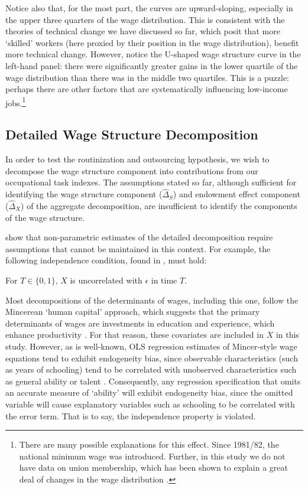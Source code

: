Notice also that, for the most part, the curves are upward-sloping, especially in the upper three quarters of the wage distribution. This is consistent with the theories of technical change we have discussed so far, which posit that more `skilled' workers (here proxied by their position in the wage distribution), benefit more technical change. However, notice the U-shaped wage structure curve in the left-hand panel: there were significantly greater gains in the lower quartile of the wage distribution than there was in the middle two quartiles. This is a puzzle: perhaps there are other factors that are systematically influencing low-income jobs.\footnote{There are many possible explanations for this effect. Since 1981/82, the national minimum wage was introduced. Further, in this study we do not have data on union membership, which has been shown to explain a great deal of changes in the wage distribution \citep{Leigh2013,Borland1996}.}

\subsection{Detailed Wage Structure Decomposition}

In order to test the routinization and outsourcing hypothesis, we wish to decompose the wage structure component into contributions from our occupational task indexes. The assumptions stated so far, although sufficient for identifying the wage structure component ($\hat{\Delta}_S$) and endowment effect component ($\hat{\Delta}_X$) of the aggregate decomposition, are insufficient to identify the components of the wage structure.

\citep[p.27]{Fortin2011} show that non-parametric estimates of the detailed decomposition require assumptions that cannot be maintained in this context. For example, the following independence condition, found in \citet{Matzkin2003}, must hold:
\begin{assumption}[Independence]\label{ass:indep}
  For $T\in\{0,1\}$, $X$ is uncorrelated with $\epsilon$ in time $T$.
\end{assumption}
Most decompositions of the determinants of wages, including this one, follow the Mincerean `human capital' approach, which suggests that the primary determinants of wages are investments in education and experience, which enhance productivity \citep{Mincer1962}. For that reason, these covariates are included in $X$ in this study. However, as is well-known, OLS regression estimates of Mincer-style wage equations tend to exhibit endogeneity bias, since observable characteristics (such as years of schooling) tend to be correlated with unobserved characteristics such as general ability or talent \citep{Card1999}. Consequently, any regression specification that omits an accurate measure of `ability' will exhibit endogeneity bias, since the omitted variable will cause explanatory variables such as schooling to be correlated with the error term. That is to say, the independence property is violated.

